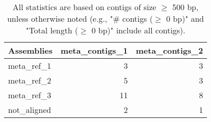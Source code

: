 \documentclass[12pt,a4paper]{article}
\begin{document}
\begin{table}[ht]
\begin{center}
\caption{All statistics are based on contigs of size $\geq$ 500 bp, unless otherwise noted (e.g., "\# contigs ($\geq$ 0 bp)" and "Total length ($\geq$ 0 bp)" include all contigs).}
\begin{tabular}{|l*{2}{|r}|}
\hline
Assemblies & meta\_contigs\_1 & meta\_contigs\_2 \\ \hline
meta\_ref\_1 & 3 & 3 \\ \hline
meta\_ref\_2 & 5 & 3 \\ \hline
meta\_ref\_3 & 11 & 8 \\ \hline
not\_aligned & 2 & 1 \\ \hline
\end{tabular}
\end{center}
\end{table}
\end{document}
